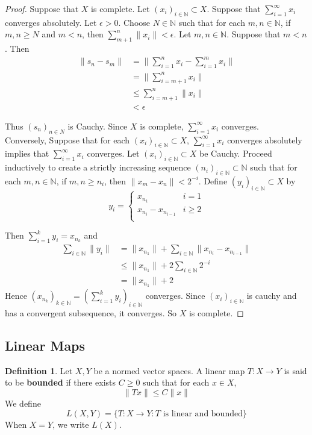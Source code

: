 \documentclass[12pt]{amsart}
\theoremstyle{definition}
\newtheorem{defn}[definition]{Definition}
\newcommand{\ep}{\epsilon}
\newcommand{\N}{\mathbb{N}}
\newcommand{\seq}[2]{(#1_{#2})_{#2 \in \N}}
\begin{document}
	\begin{proof}
		Suppose that $X$ is complete. Let $\seq{x}{i} \subset X$. Suppose that $\sum_{i=1}^{\infty}x_i$ converges absolutely. Let $\ep >0$. Choose $N \in \N$ such that for each $m,n \in \N$, if $m, n \geq N$ and $m< n$, then $\sum_{m+1}^n \|x_i \|< \ep$. Let $m, n \in \N$. Suppose that $m<n$. Then 
		\begin{align*}
			\|s_n-s_m \|
			&= \bigg \|\sum_{i=1}^n x_i -\sum_{i=1}^m x_i\bigg \|\\
			&= \bigg\|\sum_{i=m+1}^{n} x_i \bigg \| \\
			& \leq \sum_{i=m+1}^n \|x_i \|\\
			& < \ep
		\end{align*}
		
		Thus $(s_n)_{n \in N}$ is Cauchy. Since $X$ is complete, $\sum_{i=1}^{\infty}x_i$ converges. \\
		Conversely, Suppose that for each $\seq{x}{i} \subset X$, $\sum_{i =1}^{\infty}x_i$ converges absolutely implies that $\sum_{i=1}^{\infty}x_i$ converges. Let $\seq{x}{i} \subset X$ be Cauchy. Proceed inductively to create a strictly increasing sequence $(n_i)_{i \in \N} \subset \N$ such that for each $m, n \in \N$, if $m,n \geq n_i$, then $ \|x_m-x_n \|< 2^{-i}$. Define $(y_i)_{i \in \N} \subset X$ by 
		\[ y_i = \begin{cases}
			x_{n_1} & i=1 \\
			x_{n_i} - x_{n_{i-1}} & i \geq 2\\
		\end{cases}\]
		
		Then $\sum_{i=1}^k y_i = x_{n_k}$ and 
		\begin{align*}
			\sum_{i \in \N} \|y_i \|
			&= \|x_{n_1} \|+ \sum_{i \in \N} \|x_{n_i}-x_{n_{i-1}} \|\\
			& \leq \|x_{n_1} \|+ 2\sum_{i \in \N}2^{-i}\\
			& = \|x_{n_1} \|+2
		\end{align*}
		Hence $(x_{n_k})_{k \in \N} = (\sum_{i=1}^k y_i)_{i\in \N}$ converges. Since $(x_i)_{i \in \N}$ is cauchy and has a convergent subsequence, it converges. So $X$ is complete.
	\end{proof}
	\newpage
	
	\subsection{Linear Maps}
	
	\begin{defn}
		Let $X,Y$ be a normed vector spaces. A linear map $T:X \rightarrow Y$ is said to be \textbf{bounded} if there exists $C \geq 0$ such that for each $x \in X$, $$\|Tx \|\leq C \|x \|$$ We define $$L(X,Y) = \{T:X \rightarrow Y: T \text{ is linear and bounded}\}$$
		When $X=Y$, we write $L(X)$.
	\end{defn}
	
\end{document}
